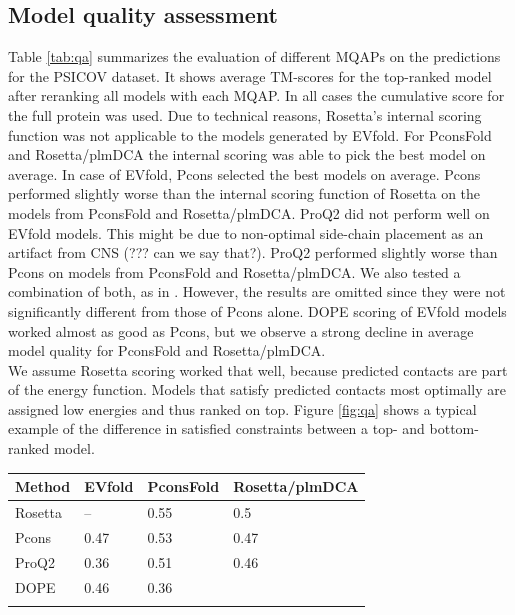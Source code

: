 \documentclass{bioinfo}
\begin{document}
\subsection{Model quality assessment}
Table \ref{tab:qa} summarizes the evaluation of different MQAPs on the predictions for the PSICOV dataset. It shows average TM-scores for the top-ranked model after reranking all models with each MQAP. In all cases the cumulative score for the full protein was used. Due to technical reasons, Rosetta's internal scoring function was not applicable to the models generated by EVfold. For PconsFold and Rosetta/plmDCA the internal scoring was able to pick the best model on average. In case of EVfold, Pcons selected the best models on average. Pcons performed slightly worse than the internal scoring function of Rosetta on the models from PconsFold and Rosetta/plmDCA. ProQ2 did not perform well on EVfold models. This might be due to non-optimal side-chain placement as an artifact from CNS (??? can we say that?). ProQ2 performed slightly worse than Pcons on models from PconsFold and Rosetta/plmDCA. We also tested a combination of both, as in \citeauthor{wallner_pcons.net:_2007} \citeyear{wallner_pcons.net:_2007}. However, the results are omitted since they were not significantly different from those of Pcons alone. DOPE scoring of EVfold models worked almost as good as Pcons, but we observe a strong decline in average model quality for PconsFold and Rosetta/plmDCA. \\\indent
We assume Rosetta scoring worked that well, because predicted contacts are part of the energy function. Models that satisfy predicted contacts most optimally are assigned low energies and thus ranked on top. Figure \ref{fig:qa} shows a typical example of the difference in satisfied constraints between a top- and bottom-ranked model. 

\begin{table}[!t]
{\begin{tabular}{llll}\toprule
    Method  & EVfold & PconsFold & Rosetta/plmDCA \\ \midrule
    Rosetta & --     & 0.55     & 0.5          \\
    Pcons   & 0.47  & 0.53     & 0.47          \\
    ProQ2   & 0.36  & 0.51     & 0.46          \\
    DOPE    & 0.46  & 0.36     & ~              \\ \botrule
\end{tabular}}{}
\end{table}
\end{document}
